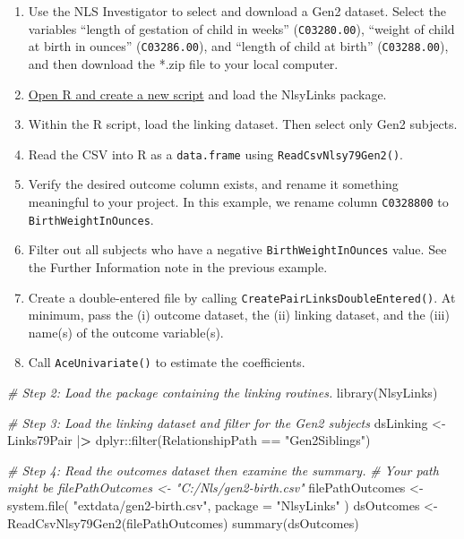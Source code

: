 \documentclass[smallextended]{svjour3}       %
\providecommand{\tightlist}{%
  \setlength{\itemsep}{0pt}\setlength{\parskip}{0pt}}
\newenvironment{Shaded}{\begin{snugshade}}{\end{snugshade}}
\newcommand{\AttributeTok}[1]{\textcolor[rgb]{0.77,0.63,0.00}{#1}}
\newcommand{\CommentTok}[1]{\textcolor[rgb]{0.56,0.35,0.01}{\textit{#1}}}
\newcommand{\ErrorTok}[1]{\textcolor[rgb]{0.64,0.00,0.00}{\textbf{#1}}}
\newcommand{\FunctionTok}[1]{\textcolor[rgb]{0.00,0.00,0.00}{#1}}
\newcommand{\NormalTok}[1]{#1}
\newcommand{\OtherTok}[1]{\textcolor[rgb]{0.56,0.35,0.01}{#1}}
\newcommand{\SpecialCharTok}[1]{\textcolor[rgb]{0.00,0.00,0.00}{#1}}
\newcommand{\StringTok}[1]{\textcolor[rgb]{0.31,0.60,0.02}{#1}}
\begin{document}
\begin{enumerate}
\def\labelenumi{\arabic{enumi}.}
\tightlist
\item
  Use the NLS Investigator to select and download a Gen2 dataset. Select
  the variables ``length of gestation of child in weeks''
  (\texttt{C03280.00}), ``weight of child at birth in ounces''
  (\texttt{C03286.00}), and ``length of child at birth''
  (\texttt{C03288.00}), and then download the *.zip file to your local
  computer.
\item
  \protect\hyperlink{appendix-creating-and-saving-r-scripts}{Open R and
  create a new script} and load the NlsyLinks package.
\item
  Within the R script, load the linking dataset. Then select only Gen2
  subjects.
\item
  Read the CSV into R as a \texttt{data.frame} using
  \texttt{ReadCsvNlsy79Gen2()}.
\item
  Verify the desired outcome column exists, and rename it something
  meaningful to your project. In this example, we rename column
  \texttt{C0328800} to \texttt{BirthWeightInOunces}.
\item
  Filter out all subjects who have a negative
  \texttt{BirthWeightInOunces} value. See the Further Information note
  in the previous example.
\item
  Create a double-entered file by calling
  \texttt{CreatePairLinksDoubleEntered()}. At minimum, pass the (i)
  outcome dataset, the (ii) linking dataset, and the (iii) name(s) of
  the outcome variable(s).
\item
  Call \texttt{AceUnivariate()} to estimate the coefficients.
\end{enumerate}

\begin{Shaded}
\begin{Highlighting}[]
\CommentTok{\# Step 2: Load the package containing the linking routines.}
\FunctionTok{library}\NormalTok{(NlsyLinks)}

\CommentTok{\# Step 3: Load the linking dataset and filter for the Gen2 subjects}
\NormalTok{dsLinking }\OtherTok{\textless{}{-}}
\NormalTok{  Links79Pair }\SpecialCharTok{|}\ErrorTok{\textgreater{}}
\NormalTok{  dplyr}\SpecialCharTok{::}\FunctionTok{filter}\NormalTok{(RelationshipPath }\SpecialCharTok{==} \StringTok{"Gen2Siblings"}\NormalTok{)}

\CommentTok{\# Step 4: Read the outcomes dataset then examine the summary.}
\CommentTok{\#   Your path might be \textasciigrave{}filePathOutcomes \textless{}{-} "C:/Nls/gen2{-}birth.csv"\textasciigrave{}}
\NormalTok{filePathOutcomes }\OtherTok{\textless{}{-}}
  \FunctionTok{system.file}\NormalTok{(}
    \StringTok{"extdata/gen2{-}birth.csv"}\NormalTok{,}
    \AttributeTok{package =} \StringTok{"NlsyLinks"}
\NormalTok{  )}
\NormalTok{dsOutcomes }\OtherTok{\textless{}{-}} \FunctionTok{ReadCsvNlsy79Gen2}\NormalTok{(filePathOutcomes)}
\FunctionTok{summary}\NormalTok{(dsOutcomes)}
\end{Highlighting}
\end{Shaded}
\end{document}
